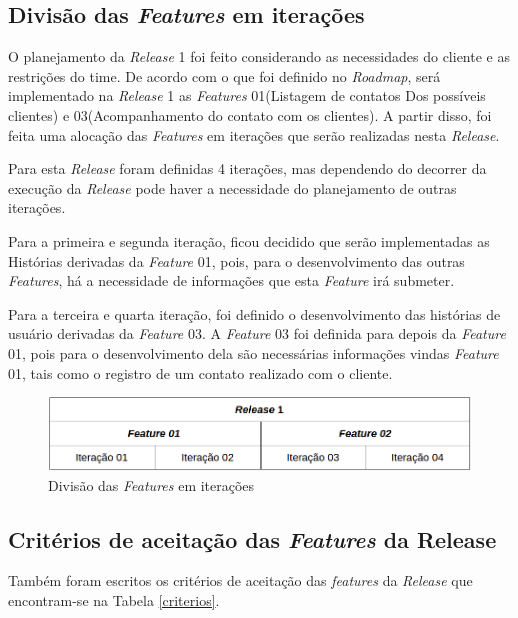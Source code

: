 \subsection{Divisão das \textit{Features} em iterações}
O planejamento da \textit{Release} 1 foi feito considerando as necessidades do cliente e as restrições do time.
De acordo com o que foi definido no \textit{Roadmap}, será implementado na \textit{Release} 1 as \textit{Features} 01(Listagem de contatos Dos possíveis clientes) e 03(Acompanhamento do contato com os clientes). A partir disso, foi feita uma alocação das \textit{Features} em iterações que serão realizadas nesta \textit{Release}.

Para esta \textit{Release} foram definidas 4 iterações, mas dependendo do decorrer da execução da \textit{Release} pode haver a necessidade do planejamento de outras iterações. 

Para a primeira e segunda iteração, ficou decidido que serão implementadas as Histórias derivadas da \textit{Feature }01, pois, para o desenvolvimento das outras \textit{Features}, há a necessidade de informações que esta \textit{Feature }irá submeter.

Para a terceira e quarta iteração, foi definido o desenvolvimento das histórias de usuário derivadas da \textit{Feature }03. A \textit{Feature }03 foi definida para depois da  \textit{Feature }01, pois para o desenvolvimento dela são necessárias informações vindas \textit{Feature }01, tais como o registro de um contato realizado com o cliente.

\begin{figure}[!htb]
\includegraphics[scale=0.5]{figuras/planejamento_release.png}
\caption{Divisão das \textit{Features} em iterações}
\label{fig:backlog}
\end{figure}

\subsection{Critérios de aceitação das \textit{Features} da Release}
Também foram escritos os critérios de aceitação das \textit{features} da \textit{Release} que encontram-se na Tabela \ref{criterios}.

